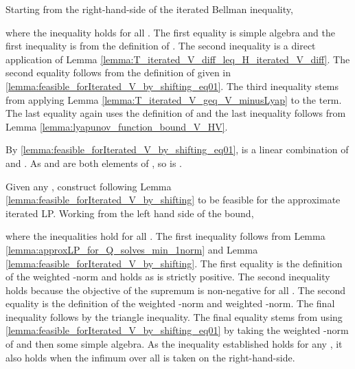 \documentclass[journal]{IEEEtran}
\begin{document}
\vspace{0.2cm}

\begin{IEEEproof}
	Starting from the right-hand-side of the iterated Bellman inequality,

	
where the inequality holds for all . The first equality is simple algebra and the first inequality is from the definition of . The second inequality is a direct application of Lemma \ref{lemma:T_iterated_V_diff_leq_H_iterated_V_diff}. The second equality follows from the definition of  given in \eqref{lemma:feasible_forIterated_V_by_shifting_eq01}. The third inequality stems from applying Lemma \ref{lemma:T_iterated_V_geq_V_minusLyap} to the  term. The last equality again uses the definition of  and the last inequality follows from Lemma \ref{lemma:lyapunov_function_bound_V_HV}.
	
	By \eqref{lemma:feasible_forIterated_V_by_shifting_eq01},  is a linear combination of  and . As  and  are both elements of , so is .
\end{IEEEproof}



\vspace{0.2cm}


\begin{IEEEproof}

	Given any , construct  following Lemma \ref{lemma:feasible_forIterated_V_by_shifting} to be feasible for the approximate iterated LP. Working from the left hand side of the bound,

where the inequalities hold for all . The first inequality follows from Lemma \ref{lemma:approxLP_for_Q_solves_min_1norm} and Lemma \ref{lemma:feasible_forIterated_V_by_shifting}. The first equality is the definition of the weighted -norm and holds as  is strictly positive. The second inequality holds because the objective of the supremum is non-negative for all . The second equality is the definition of the weighted -norm and weighted -norm. The final inequality follows by the triangle inequality. The final equality stems from using \eqref{lemma:feasible_forIterated_V_by_shifting_eq01} by taking the weighted -norm of  and then some simple algebra.
As the inequality established holds for any , it also holds when the infimum over all  is taken on the right-hand-side.
	
\end{IEEEproof}
 
\end{document}
